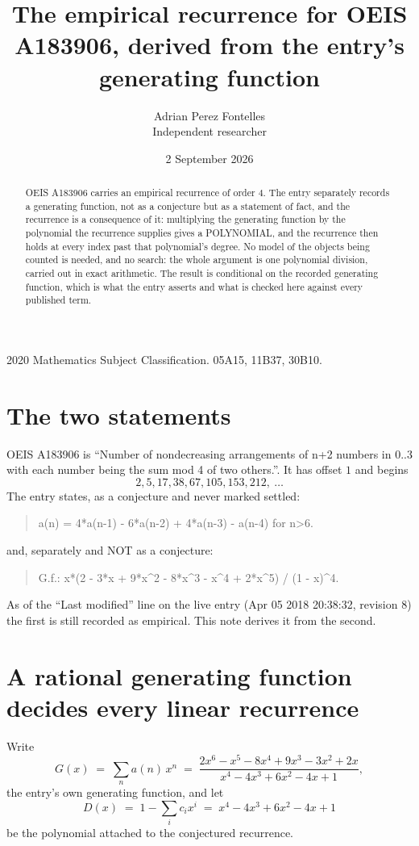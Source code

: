 \documentclass[11pt,a4paper]{article}
\title{The empirical recurrence for OEIS A183906, derived from the entry's generating function}
\author{Adrian Perez Fontelles\\ \small Independent researcher}
\date{2 September 2026}
\theoremstyle{plain}
\theoremstyle{definition}
\begin{document}
\maketitle

\begin{abstract}
OEIS A183906 carries an empirical recurrence of order $4$. The entry separately records a
generating function, not as a conjecture but as a statement of fact, and the recurrence is a
consequence of it: multiplying the generating function by the polynomial the recurrence
supplies gives a POLYNOMIAL, and the recurrence then holds at every index past that
polynomial's degree. No model of the objects being counted is needed, and no search: the
whole argument is one polynomial division, carried out in exact arithmetic. The result is
conditional on the recorded generating function, which is what the entry asserts and what is
checked here against every published term.
\end{abstract}

\noindent\small 2020 Mathematics Subject Classification. 05A15, 11B37, 30B10.\normalsize

\section{The two statements}

OEIS A183906 is ``Number of nondecreasing arrangements of n+2 numbers in 0..3 with each number being the sum mod 4 of two others.''. It has offset $1$ and begins
\[
2, 5, 17, 38, 67, 105, 153, 212,\ \dots
\]
The entry states, as a conjecture and never marked settled:
\begin{quote}
a(n) = 4*a(n-1) - 6*a(n-2) + 4*a(n-3) - a(n-4) for n>6.
\end{quote}
and, separately and NOT as a conjecture:
\begin{quote}
G.f.: x*(2 - 3*x + 9*x\^{}2 - 8*x\^{}3 - x\^{}4 + 2*x\^{}5) / (1 - x)\^{}4.
\end{quote}
As of the ``Last modified'' line on the live entry (Apr 05 2018 20:38:32, revision 8) the first is still
recorded as empirical. This note derives it from the second.

\section{A rational generating function decides every linear recurrence}

Write
\[
G(x)\;=\;\sum_{n}a(n)\,x^{n}\;=\;\frac{2 x^{6} - x^{5} - 8 x^{4} + 9 x^{3} - 3 x^{2} + 2 x}{x^{4} - 4 x^{3} + 6 x^{2} - 4 x + 1},
\]
the entry's own generating function, and let
\[
D(x)\;=\;1-\sum_i c_i x^{i}\;=\;x^{4} - 4 x^{3} + 6 x^{2} - 4 x + 1
\]
be the polynomial attached to the conjectured recurrence.
\end{document}
